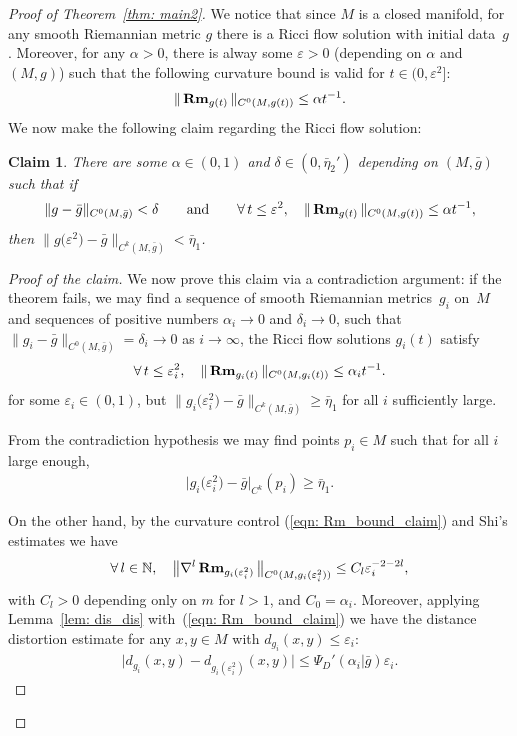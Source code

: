 \documentclass[10pt,a4paper]{amsart}
\numberwithin{equation}{section}
\newtheorem{Claim}[Theorem]{Claim}
 { \theoremstyle{definition}
\newtheorem{Example}[Theorem]{Example}
\newtheorem{Remark}[Theorem]{Remark} }
\newcommand{\Rm}{\operatorname{\bf Rm}}
\begin{document}
 \begin{proof}[Proof of Theorem~\ref{thm: main2}]
 We notice that since $M$ is a closed manifold, for
 any smooth Riemannian metric $g$ there is a Ricci flow solution with initial
 data~$g$. Moreover, for any $\alpha>0$, there is alway some $\varepsilon>0$
 (depending on $\alpha$ and $(M,g)$) such that the following curvature bound is
 valid for $t\in \big(0,\varepsilon^2\big]$:
\begin{align*}
 \|\Rm_{g(t)} \|_{C^0(M,g(t))} \le \alpha t^{-1}.
\end{align*}
We now make the following claim regarding the Ricci flow solution:
\begin{Claim}
There are some $\alpha \in (0,1)$ and $\delta\in (0,\bar{\eta}_2')$ depending on
$(M,\bar{g})$ such that if
\begin{align*} \|g-\bar{g} \|_{C^0(M,\bar{g})} < \delta\qquad
\text{and}\qquad \forall\, t\le
\varepsilon^2,\quad \|\Rm_{g(t)} \|_{C^0(M,g(t))} \le \alpha t^{-1},
\end{align*}
then $\big\|g\big(\varepsilon^2\big)-\bar{g}\big\|_{C^k(M,\bar{g})}<\bar{\eta}_1$.
\end{Claim}
\begin{proof}[Proof of the claim]
We now prove this claim via a contradiction argument: if the theorem fails,
 we may find a sequence of smooth Riemannian metrics~$g_i$ on~$M$ and sequences
 of positive numbers $\alpha_i\to 0$ and $\delta_i\to 0$, such that
 $ \|g_i-\bar{g} \|_{C^0(M,\bar{g})} =\delta_i\to 0$ as $i\to \infty$,
 the Ricci flow solutions $g_i(t)$ satisfy
\begin{align}\label{eqn: Rm_bound_claim}
\forall\, t\le \varepsilon_i^2,\quad \|\Rm_{g_i(t)} \|_{C^0(M,g_i(t))}
\le \alpha_i t^{-1}.
\end{align}
for some $\varepsilon_i\in (0,1)$, but $\big\|g_i\big(\varepsilon_i^2\big)
-\bar{g}\big\|_{C^k(M,\bar{g})} \ge \bar{\eta}_1$ for all $i$ sufficiently
large.

From the contradiction hypothesis we may find points $p_i\in M$ such that for
all $i$ large enough,
\begin{align}\label{eqn: C3_contradiction}
\big|g_i\big(\varepsilon_i^2\big)-\bar{g}\big|_{C^k}(p_i) \ge \bar{\eta}_1.
\end{align}

On the other hand, by the curvature control (\ref{eqn: Rm_bound_claim}) and
Shi's estimates we have
\begin{align}\label{eqn: regularity}
\forall\, l\in \mathbb{N},\quad
\big\|\nabla^l\Rm_{g_i(\varepsilon_i^2)}\big\|_{C^0(M,g_i(\varepsilon_i^2))}
\le C_l \varepsilon_i^{-2-2l},
\end{align}
with $C_l>0$ depending only on $m$ for $l>1$, and $C_0=\alpha_i$.
Moreover, applying Lemma~\ref{lem: dis_dis} with~(\ref{eqn: Rm_bound_claim}) we
have the distance distortion estimate for any $x,y\in M$ with $d_{g_i}(x,y)\le
\varepsilon_i$:
\begin{align*}
\big|d_{g_i}(x,y)-d_{g_i(\varepsilon_i^2)}(x,y)\big| \le
\Psi_D'(\alpha_i|\bar{g})\varepsilon_i.
\end{align*}


\end{proof}
\end{proof}
\end{document}

